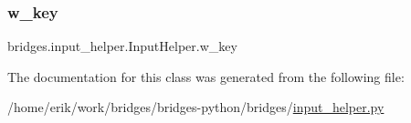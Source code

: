 \mbox{\label{classbridges_1_1input__helper_1_1_input_helper_a5805e22dfd0bda43e27aacb3bc638df3}} 
\subsubsection{\texorpdfstring{w\+\_\+key}{w\_key}}
{\footnotesize\ttfamily bridges.\+input\+\_\+helper.\+Input\+Helper.\+w\+\_\+key}



The documentation for this class was generated from the following file\+:\begin{DoxyCompactItemize}
\item 
/home/erik/work/bridges/bridges-\/python/bridges/\hyperlink{input__helper_8py}{input\+\_\+helper.\+py}\end{DoxyCompactItemize}
